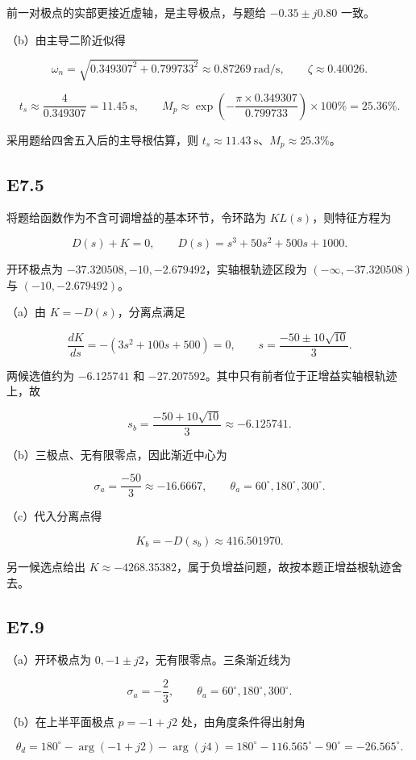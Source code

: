 \documentclass[UTF8,12pt]{ctexart}
\begin{document}
前一对极点的实部更接近虚轴，是主导极点，与题给 $-0.35\pm j0.80$ 一致。

（b）由主导二阶近似得

\[
\omega_n=\sqrt{0.349307^2+0.799733^2}\approx0.87269\ \mathrm{rad/s},\qquad\zeta\approx0.40026.
\]

\[
t_s\approx\frac4{0.349307}=11.45\ \mathrm{s},\qquad M_p\approx\exp\left(-\frac{\pi\times0.349307}{0.799733}\right)\times100\%=25.36\%.
\]

采用题给四舍五入后的主导根估算，则 $t_s\approx11.43\ \mathrm{s}$、$M_p\approx25.3\%$。


\subsection*{E7.5}
将题给函数作为不含可调增益的基本环节，令环路为 $K L(s)$，则特征方程为

\[
D(s)+K=0,\qquad D(s)=s^3+50s^2+500s+1000.
\]

开环极点为 $-37.320508,-10,-2.679492$，实轴根轨迹区段为 $(-\infty,-37.320508)$ 与 $(-10,-2.679492)$。

（a）由 $K=-D(s)$，分离点满足

\[
\frac{dK}{ds}=-(3s^2+100s+500)=0,\qquad s=\frac{-50\pm10\sqrt{10}}3.
\]

两候选值约为 $-6.125741$ 和 $-27.207592$。其中只有前者位于正增益实轴根轨迹上，故

\[
s_b=\frac{-50+10\sqrt{10}}3\approx-6.125741.
\]

（b）三极点、无有限零点，因此渐近中心为

\[
\sigma_a=\frac{-50}{3}\approx-16.6667,\qquad\theta_a=60^\circ,180^\circ,300^\circ.
\]

（c）代入分离点得

\[
K_b=-D(s_b)\approx416.501970.
\]

另一候选点给出 $K\approx-4268.35382$，属于负增益问题，故按本题正增益根轨迹舍去。


\subsection*{E7.9}
（a）开环极点为 $0,-1\pm j2$，无有限零点。三条渐近线为

\[
\sigma_a=-\frac23,\qquad\theta_a=60^\circ,180^\circ,300^\circ.
\]

（b）在上半平面极点 $p=-1+j2$ 处，由角度条件得出射角

\[
\theta_d=180^\circ-\arg(-1+j2)-\arg(j4)=180^\circ-116.565^\circ-90^\circ=-26.565^\circ.
\]
\end{document}

